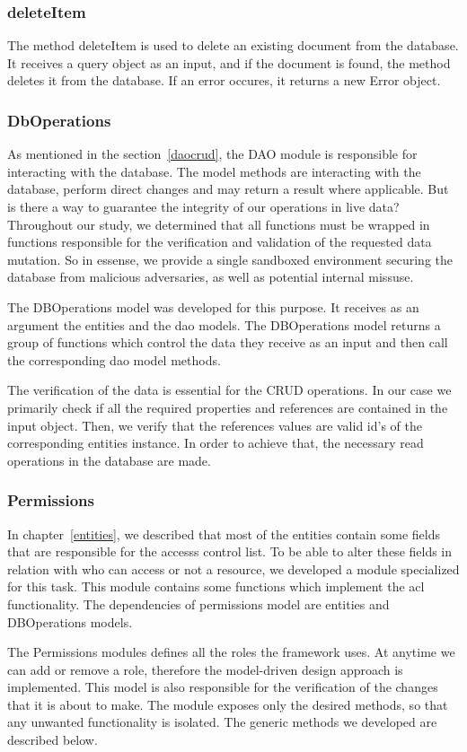 \subsubsection{deleteItem}
The method deleteItem is used to delete an existing document from the database. It receives a query object as an input, and if the document is found, the method deletes it from the database. If an error occures, it returns a new Error object.

\subsubsection{DbOperations}
As mentioned in the section~\ref{daocrud}, the DAO module is responsible for interacting with the database. The model methods are interacting with the database, perform direct changes and may return a result where applicable. But is there a way to guarantee the integrity of our operations in live data? Throughout our study, we determined that all functions must be wrapped in functions responsible for the verification and validation of the requested data mutation. So in essense, we provide a single sandboxed environment securing the database from malicious adversaries, as well as potential internal missuse. \par 
	The DBOperations model was developed for this purpose. It receives as an argument the entities and the dao models. The DBOperations model returns a group of functions which control the data they receive as an input and then call the corresponding dao model methods. \par 
	The verification of the data is essential for the CRUD operations. In our case we primarily check if all the required properties and references are contained in the input object. Then, we verify that the references values are valid id's of the corresponding entities instance. In order to achieve that, the necessary read operations in the database are made.
	
\subsubsection{Permissions}
In chapter~\ref{entities}, we described that most of the entities contain some fields that are responsible for the accesss control list. To be able to alter these fields in relation with who can access or not a resource, we developed a module specialized for this task. This module contains some functions which implement the acl functionality. The dependencies of permissions model are entities and DBOperations models. \par 
	The Permissions modules defines all the roles the framework uses. At anytime we can add or remove a role, therefore the model-driven design approach is implemented. This model is also responsible for the verification of the changes that it is about to make. The module exposes only the desired methods, so that any unwanted functionality is isolated. The generic methods we developed are described below. 


